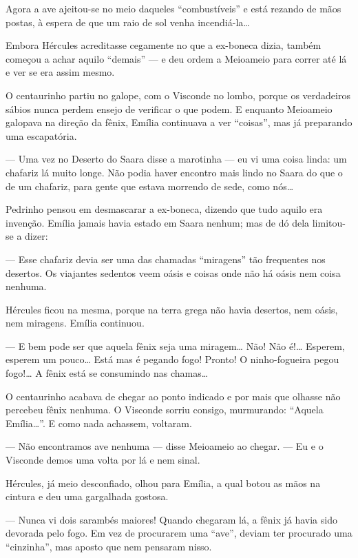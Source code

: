 Agora a ave ajeitou-se no meio daqueles ``combustíveis'' e está rezando
de mãos postas, à espera de que um raio de sol venha incendiá-la\ldots{}

Embora Hércules acreditasse cegamente no que a ex-boneca dizia, também
começou a achar aquilo ``demais'' --- e deu ordem a Meioameio para
correr até lá e ver se era assim mesmo.

O centaurinho partiu no galope, com o Visconde no lombo, porque os
verdadeiros sábios nunca perdem ensejo de verificar o que podem. E
enquanto Meioameio galopava na direção da fênix, Emília continuava a ver
``coisas'', mas já preparando uma escapatória.

--- Uma vez no Deserto do Saara disse a marotinha --- eu vi uma coisa
linda: um chafariz lá muito longe. Não podia haver encontro mais lindo
no Saara do que o de um chafariz, para gente que estava morrendo de
sede, como nós\ldots{}

Pedrinho pensou em desmascarar a ex-boneca, dizendo que tudo aquilo era
invenção. Emília jamais havia estado em Saara nenhum; mas de dó dela
limitou-se a dizer:

--- Esse chafariz devia ser uma das chamadas ``miragens'' tão frequentes
nos desertos. Os viajantes sedentos veem oásis e coisas onde não há
oásis nem coisa nenhuma.

Hércules ficou na mesma, porque na terra grega não havia desertos, nem
oásis, nem miragens. Emília continuou.

--- E bem pode ser que aquela fênix seja uma miragem\ldots{} Não! Não
é!\ldots{} Esperem, esperem um pouco\ldots{} Está mas é pegando fogo!
Pronto! O ninho-fogueira pegou fogo!\ldots{} A fênix está se consumindo
nas chamas\ldots{}

O centaurinho acabava de chegar ao ponto indicado e por mais que olhasse
não percebeu fênix nenhuma. O Visconde sorriu consigo, murmurando:
``Aquela Emília\ldots{}''. E como nada achassem, voltaram.

--- Não encontramos ave nenhuma --- disse Meioameio ao chegar. --- Eu e
o Visconde demos uma volta por lá e nem sinal.

Hércules, já meio desconfiado, olhou para Emília, a qual botou as mãos
na cintura e deu uma gargalhada gostosa.

--- Nunca vi dois sarambés maiores! Quando chegaram lá, a fênix já havia
sido devorada pelo fogo. Em vez de procurarem uma ``ave'', deviam ter
procurado uma ``cinzinha'', mas aposto que nem pensaram nisso.

